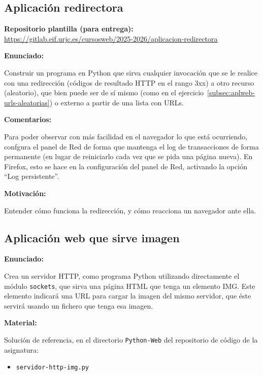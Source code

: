 \subsection{Aplicación redirectora}
\label{subsec:aplweb-redirectora}

\textbf{Repositorio plantilla (para entrega):} \\
\url{https://gitlab.eif.urjc.es/cursosweb/2025-2026/aplicacion-redirectora}

\textbf{Enunciado:}

Construir un programa en Python que sirva cualquier invocación que se le realice con una redirección (códigos de resultado HTTP en el rango 3xx) a otro recurso (aleatorio), que bien puede ser de sí mismo (como en el ejercicio~\ref{subsec:aplweb-urls-aleatorias}) o externo a partir de una lista con URLs.

\textbf{Comentarios:}

Para poder observar con más facilidad en el navegador lo que está ocurriendo, confgura el panel de Red de forma que mantenga el log de transacciones de forma permanente (en lugar de reiniciarlo cada vez que se pida una página nueva). En Firefox, esto se hace en la configuración del panel de Red, activando la opción ``Log persistente''.


\textbf{Motivación:}

Entender cómo funciona la redirección, y cómo reacciona un navegador ante ella.

\subsection{Aplicación web que sirve imagen}
\label{subsec:aplweb-img}

\textbf{Enunciado:}

Crea un servidor HTTP, como programa Python utilizando directamente el módulo \verb|sockets|, que sirva una página HTML que tenga un elemento IMG. Este elemento indicará una URL para cargar la imagen del mismo servidor, que éste servirá usando un fichero que tenga esa imagen.

\textbf{Material:}

Solución de referencia, en el directorio \verb|Python-Web| del repositorio de código de la asignatura:


\begin{itemize}
\item \verb|servidor-http-img.py|
\end{itemize}

